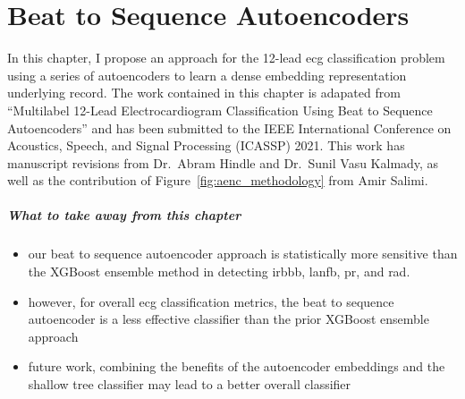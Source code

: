 \documentclass[\main/thesis.tex]{subfiles}
\begin{document}
\chapter{Beat to Sequence Autoencoders}
\label{chp:dl_autoenc}

In this chapter, I propose an approach for the 12-lead \gls{ecg} classification problem using a series of autoencoders to learn a dense embedding representation underlying record.
The work contained in this chapter is adapated from ``Multilabel 12-Lead Electrocardiogram Classification Using Beat to Sequence Autoencoders'' and has been submitted to the IEEE International Conference on Acoustics, Speech, and Signal Processing (ICASSP) 2021.
This work has manuscript revisions from Dr.\ Abram Hindle and Dr.\ Sunil Vasu Kalmady, as well as the contribution of Figure~\ref{fig:aenc_methodology} from Amir Salimi.

\paragraph{What to take away from this chapter}
\begin{itemize}
    \item our beat to sequence autoencoder approach is statistically more sensitive than the XGBoost ensemble method in detecting \gls{irbbb}, \gls{lanfb}, \gls{pr}, and \gls{rad}.
    \item however, for overall \gls{ecg} classification metrics, the beat to sequence autoencoder is a less effective classifier than the prior XGBoost ensemble approach
    \item future work, combining the benefits of the autoencoder embeddings and the shallow tree classifier may lead to a better overall classifier 
\end{itemize}

\end{document}
